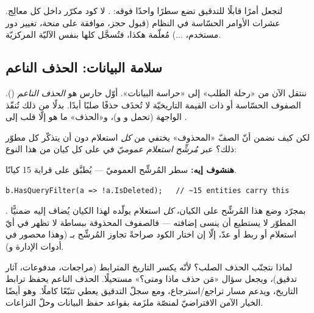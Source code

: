 \begin{keyp}
لتجعل أمرًا قابلًا للتدقيق تضع سطرًا واحدًا فوقه: \code{[Auditable(...)]}. لا كود مكرّر
داخل كل معالِج. عشرات الأوامر الحسّاسة في النظام (قبول حجز، موافقة على منحة، تغيير دور
مستخدم، ...) مُعلّمة هكذا، فتُسجَّل كلها بنفس الآليّة المركزيّة.
\end{keyp}

\subsection{سلامة البيانات: الحذف الناعم}

ننتقل الآن من «رحلة الطلب» إلى «حراسة البيانات». أوّل حارس هو \emph{الحذف الناعم}
(). الصفوف الحسّاسة أو ذات القيمة التاريخيّة لا تُحذَف حذفًا صلبًا أبدًا.
بدلًا من ذلك تُنفّذ الواجهة  (تحمل  و
و)، و«الحذف» ما هو إلّا قلب  إلى .

لكن كيف نضمن أنّ الصفّ «المحذوف» يختفي من \emph{كل} استعلام دون أن يتذكّر كل مطوّر ذلك؟
عبر \emph{مُرشِّح استعلام عموميّ} في  على كل كيان من هذا النوع:

\textbf{هنشوف إيه:} سطر المُرشِّح العموميّ — يُطبَّق على قرابة 15 كيانًا.

\begin{english}
\begin{lstlisting}[language={[Sharp]C}]
b.HasQueryFilter(a => !a.IsDeleted);   // ~15 entities carry this
\end{lstlisting}
\end{english}

\begin{idea}
بمجرّد وضع هذا المُرشِّح على الكيان، \emph{كل} استعلام  يولّده  لهذا
الكيان يُضاف إليه ضمنيًّا . المطوّر لا يستطيع أن ينسى إضافته —
فالصفوف المحذوفة ببساطة لا تظهر في أيّ استعلام أو ربط أو عدّ، إلّا إن اختار الكود صراحةً
تجاوز المُرشِّح بـ  (وهذا محصور في أدوات الإدارة و).
\end{idea}

\begin{why}
لماذا نتجنّب الحذف الصلب؟ لأنّه يكسر التاريخ المترابط (مراجعات، مدفوعات، آثار تدقيق)،
ويجعل سؤال «مَن حذف ماذا ومتى؟» مستحيلًا. الحذف الناعم يحفظ ترابط التاريخ، ويدعم مسار
تراجع/استرجاع، ومع سجلّ التدقيق يعطي تتبّعًا كاملًا. وهو أيضًا الخيار الآمن الافتراضيّ
لمنصّة ملزَمة بقواعد حفظ البيانات وحلّ النزاعات.
\end{why}

